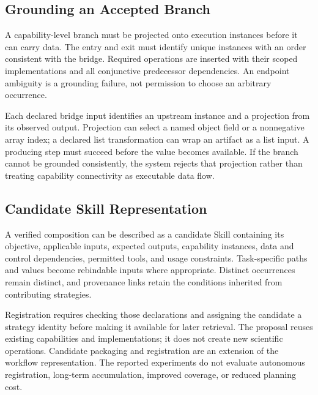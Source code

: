 \subsection{Grounding an Accepted Branch}
A capability-level branch must be projected onto execution instances before it can carry data. The entry and exit must identify unique instances with an order consistent with the bridge. Required operations are inserted with their scoped implementations and all conjunctive predecessor dependencies. An endpoint ambiguity is a grounding failure, not permission to choose an arbitrary occurrence.

Each declared bridge input identifies an upstream instance and a projection from its observed output. Projection can select a named object field or a nonnegative array index; a declared list transformation can wrap an artifact as a list input. A producing step must succeed before the value becomes available. If the branch cannot be grounded consistently, the system rejects that projection rather than treating capability connectivity as executable data flow.

\subsection{Candidate Skill Representation}
\label{app:skill-reuse}
A verified composition can be described as a candidate Skill containing its objective, applicable inputs, expected outputs, capability instances, data and control dependencies, permitted tools, and usage constraints. Task-specific paths and values become rebindable inputs where appropriate. Distinct occurrences remain distinct, and provenance links retain the conditions inherited from contributing strategies.

Registration requires checking those declarations and assigning the candidate a strategy identity before making it available for later retrieval. The proposal reuses existing capabilities and implementations; it does not create new scientific operations. Candidate packaging and registration are an extension of the workflow representation. The reported experiments do not evaluate autonomous registration, long-term accumulation, improved coverage, or reduced planning cost.
